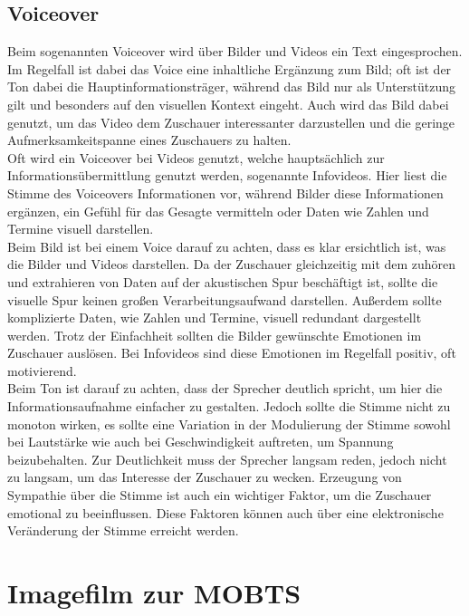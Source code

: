 \subsection{Voiceover}
Beim sogenannten Voiceover wird über Bilder und Videos ein Text eingesprochen. Im Regelfall ist dabei das Voice eine inhaltliche Ergänzung zum Bild; oft ist der Ton dabei die Hauptinformationsträger, während das Bild nur als Unterstützung gilt und besonders auf den visuellen Kontext eingeht. \autocite{Schmidt.2013} Auch wird das Bild dabei genutzt, um das Video dem Zuschauer interessanter darzustellen und die geringe Aufmerksamkeitspanne eines Zuschauers zu halten.\\
Oft wird ein Voiceover bei Videos genutzt, welche hauptsächlich zur Informationsübermittlung genutzt werden, sogenannte Infovideos. Hier liest die Stimme des Voiceovers Informationen vor, während Bilder diese Informationen ergänzen, ein Gefühl für das Gesagte vermitteln oder Daten wie Zahlen und Termine visuell darstellen.\\
Beim Bild ist bei einem Voice darauf zu achten, dass es klar ersichtlich ist, was die Bilder und Videos darstellen. Da der Zuschauer gleichzeitig mit dem zuhören und extrahieren von Daten auf der akustischen Spur beschäftigt ist, sollte die visuelle Spur keinen großen Verarbeitungsaufwand darstellen. Außerdem sollte komplizierte Daten, wie Zahlen und Termine, visuell redundant dargestellt werden. Trotz der Einfachheit sollten die Bilder gewünschte Emotionen im Zuschauer auslösen. Bei Infovideos sind diese Emotionen im Regelfall positiv, oft motivierend.\\
Beim Ton ist darauf zu achten, dass der Sprecher deutlich spricht, um hier die Informationsaufnahme einfacher zu gestalten. Jedoch sollte die Stimme nicht zu monoton wirken, es sollte eine Variation in der Modulierung der Stimme sowohl bei Lautstärke wie auch bei Geschwindigkeit auftreten, um Spannung beizubehalten. Zur Deutlichkeit muss der Sprecher langsam reden, jedoch nicht zu langsam, um das Interesse der Zuschauer zu wecken. Erzeugung von Sympathie über die Stimme ist auch ein wichtiger Faktor, um die Zuschauer emotional zu beeinflussen. Diese Faktoren können auch über eine elektronische Veränderung der Stimme erreicht werden. 
\section{Imagefilm zur MOBTS}

